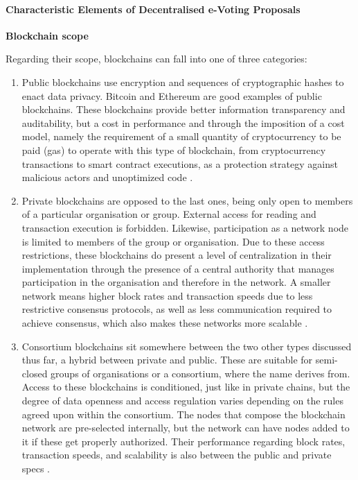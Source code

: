 \documentclass[../access.tex]{subfiles}
\begin{document}
\paragraph{Characteristic Elements of Decentralised e-Voting Proposals}
    \par
	\textbf{Blockchain scope}
    \par
	\label{blockchain-type-access-control}
		Regarding their scope, blockchains can fall into one of three categories:
		\begin{enumerate}
            \item {Public blockchains use encryption and sequences of cryptographic hashes to enact data privacy. Bitcoin and Ethereum are good examples of public blockchains. These blockchains provide better information transparency and auditability, but a cost in performance and through the imposition of a cost model, namely the requirement of a small quantity of cryptocurrency to be paid (gas) to operate with this type of blockchain, from cryptocurrency transactions to smart contract executions, as a protection strategy against malicious actors and unoptimized code \cite{Xu2017}}.

            \item {Private blockchains are opposed to the last ones, being only open to members of a particular organisation or group. External access for reading and transaction execution is forbidden. Likewise, participation as a network node is limited to members of the group or organisation. Due to these access restrictions, these blockchains do present a level of centralization in their implementation through the presence of a central authority that manages participation in the organisation and therefore in the network. A smaller network means higher block rates and transaction speeds due to less restrictive consensus protocols, as well as less communication required to achieve consensus, which also makes these networks more scalable \cite{Viriyasitavat2019}.}
			
            \item {Consortium blockchains sit somewhere between the two other types discussed thus far, a hybrid between private and public. These are suitable for semi-closed groups of organisations or a consortium, where the name derives from. Access to these blockchains is conditioned, just like in private chains, but the degree of data openness and access regulation varies depending on the rules agreed upon within the consortium. The nodes that compose the blockchain network are pre-selected internally, but the network can have nodes added to it if these get properly authorized. Their performance regarding block rates, transaction speeds, and scalability is also between the public and private specs \cite{Xinyi2018}}.
		\end{enumerate}
\end{document}
